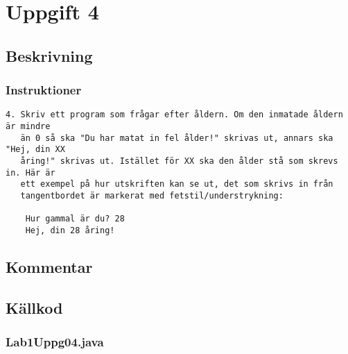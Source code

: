 \section{Uppgift 4}\label{uppgift-4}

\subsection{Beskrivning}
\subsubsection*{Instruktioner}
\begin{verbatim}
4. Skriv ett program som frågar efter åldern. Om den inmatade åldern är mindre
   än 0 så ska "Du har matat in fel ålder!" skrivas ut, annars ska "Hej, din XX
   åring!" skrivas ut. Istället för XX ska den ålder stå som skrevs in. Här är
   ett exempel på hur utskriften kan se ut, det som skrivs in från
   tangentbordet är markerat med fetstil/understrykning:

    Hur gammal är du? 28
    Hej, din 28 åring!
\end{verbatim}

\subsection{Kommentar}

\subsection{Källkod}\label{uppgift-4_src}
\subsubsection*{Lab1Uppg04.java}
\inputminted[]{java}{src/Lab1Uppg04.java}
